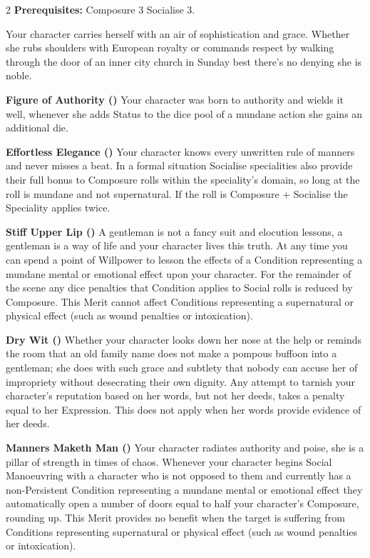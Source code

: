 \begin{multicols}{2}
\textbf{Prerequisites:} Composure 3 Socialise 3.

Your character carries herself with an air of sophistication and grace. Whether she rubs shoulders with European royalty or commands respect by walking through the door of an inner city church in Sunday best there's no denying she is noble.

\textbf{Figure of Authority (\textbullet)} Your character was born to authority and wields it well, whenever she adds Status to the dice pool of a mundane action she gains an additional die. 

\textbf{Effortless Elegance (\textbullet\textbullet)} Your character knows every unwritten rule of manners and never misses a beat. In a formal situation Socialise specialities also provide their full bonus to Composure rolls within the speciality's domain, so long at the roll is mundane and not supernatural. If the roll is Composure + Socialise the Speciality applies twice. 

\textbf{Stiff Upper Lip (\textbullet\textbullet\textbullet)} A gentleman is not a fancy suit and elocution lessons, a gentleman is a way of life and your character lives this truth. At any time you can spend a point of Willpower to lesson the effects of a Condition representing a mundane mental or emotional effect upon your character. For the remainder of the scene any dice penalties that Condition applies to Social rolls is reduced by Composure. This Merit cannot affect Conditions representing a supernatural or physical effect (such as wound penalties or intoxication).

\textbf{Dry Wit (\textbullet\textbullet\textbullet\textbullet)} Whether your character looks down her nose at the help or reminds the room that an old family name does not make a pompous buffoon into a gentleman; she does with such grace and subtlety that nobody can accuse her of impropriety without desecrating their own dignity. Any attempt to tarnish your character's reputation based on her words, but not her deeds, takes a penalty equal to her Expression. This does not apply when her words provide evidence of her deeds. 

\textbf{Manners Maketh Man (\textbullet\textbullet\textbullet\textbullet\textbullet)} Your character radiates authority and poise, she is a pillar of strength in times of chaos. Whenever your character begins Social Manoeuvring with a character who is not opposed to them and currently has a non-Persistent Condition representing a mundane mental or emotional effect they automatically open a number of doors equal to half your character's Composure, rounding up. This Merit provides no benefit when the target is suffering from Conditions representing supernatural or physical effect (such as wound penalties or intoxication).


\end{multicols}
